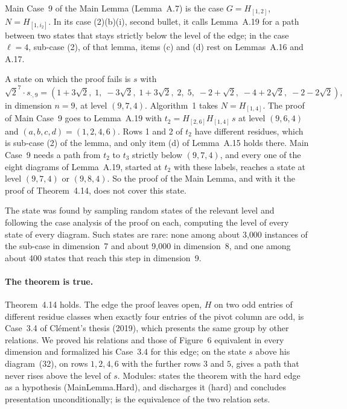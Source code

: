 \documentclass[11pt]{article}
\newcommand{\aid}[1]{\mbox{\textsf{\small #1}}}
\begin{document}
Main Case~9 of the Main Lemma (Lemma~A.7) is the case $G=H_{[1,2]}$,
$N=H_{[1,i_2]}$. In its case (2)(b)(i), second bullet, it calls
Lemma~A.19 for a path between two states that stays strictly below the
level of the edge; in the case $\ell=4$, sub-case (2), of that lemma,
items (c) and (d) rest on Lemmas~A.16 and A.17.

A state on which the proof fails is $s$ with
\[
\sqrt2^7\cdot s_{\cdot,9} = (1+3\sqrt2,\; 1,\; -3\sqrt2,\; 1+3\sqrt2,\; 2,\; 5,\; -2+\sqrt2,\; -4+2\sqrt2,\; -2-2\sqrt2),
\]
in dimension $n=9$, at level $(9,7,4)$. Algorithm~1 takes
$N=H_{[1,4]}$. The proof of Main Case~9 goes to Lemma~A.19 with
$t_2=H_{[2,6]}H_{[1,4]}\,s$ at level $(9,6,4)$ and
$(a,b,c,d)=(1,2,4,6)$. Rows 1 and 2 of $t_2$ have different residues,
which is sub-case (2) of the lemma, and only item (d) of Lemma~A.15
holds there. Main Case~9 needs a path from $t_2$ to $t_3$ strictly
below $(9,7,4)$, and every one of the eight diagrams of Lemma~A.19,
started at $t_2$ with these labels, reaches a state at level $(9,7,4)$
or $(9,8,4)$. So the proof of the Main Lemma, and with it the proof of
Theorem~4.14, does not cover this state.

The state was found by sampling random states of the relevant level
and following the case analysis of the proof on each, computing the
level of every state of every diagram. Such states are rare: none
among about 3{,}000 instances of the sub-case in dimension~7 and about
9{,}000 in dimension~8, and one among about 400 states that reach
this step in dimension~9.

\paragraph{The theorem is true.} Theorem~4.14 holds. The edge the proof
leaves open, $H$ on two odd entries of different residue classes when
exactly four entries of the pivot column are odd, is Case~3.4 of
Cl\'ement's thesis (2019), which presents the same group by other
relations. We proved his relations and those of Figure~6 equivalent
in every dimension and formalized his Case~3.4 for this edge; on the
state $s$ above his diagram~(32), on rows $1,2,4,6$ with the further
rows $3$ and $5$, gives a path that never rises above the level of
$s$. Modules:  states
the theorem with the hard edge as a hypothesis
(\aid{MainLemma.Hard}), and
 discharges it
(\aid{hard}) and concludes \aid{presentation} unconditionally;
 is the equivalence of
the two relation sets.
\end{document}
